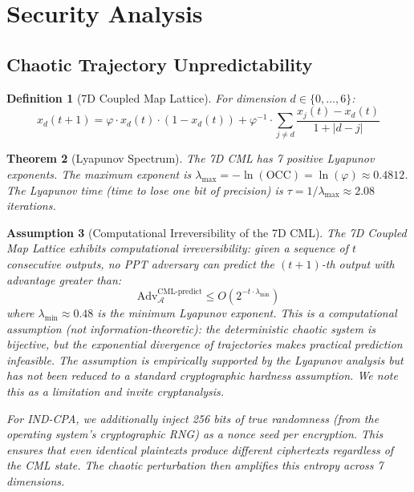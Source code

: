 \documentclass[11pt,a4paper]{article}
\newtheorem{theorem}{Theorem}[section]
\newtheorem{definition}[theorem]{Definition}
\newtheorem{assumption}[theorem]{Assumption}
\begin{document}
\section{Security Analysis}
\label{sec:security}

\subsection{Chaotic Trajectory Unpredictability}

\begin{definition}[7D Coupled Map Lattice]
For dimension $d \in \{0,\ldots,6\}$:
\begin{equation}
    x_d(t+1) = \varphi \cdot x_d(t) \cdot (1 - x_d(t)) + \varphi^{-1} \cdot \sum_{j \neq d} \frac{x_j(t) - x_d(t)}{1 + |d - j|}
\end{equation}
\end{definition}

\begin{theorem}[Lyapunov Spectrum]
The 7D CML has 7 positive Lyapunov exponents. The maximum exponent is $\lambda_{\max} = -\ln(\text{OCC}) = \ln(\varphi) \approx 0.4812$. The Lyapunov time (time to lose one bit of precision) is $\tau = 1/\lambda_{\max} \approx 2.08$ iterations.
\end{theorem}

\begin{assumption}[Computational Irreversibility of the 7D CML]
The 7D Coupled Map Lattice exhibits \textit{computational irreversibility}: given a sequence of $t$ consecutive outputs, no PPT adversary can predict the $(t+1)$-th output with advantage greater than:
\begin{equation}
    \text{Adv}^{\text{CML-predict}}_{\mathcal{A}} \leq O(2^{-t \cdot \lambda_{\min}})
\end{equation}
where $\lambda_{\min} \approx 0.48$ is the minimum Lyapunov exponent. This is a \textit{computational} assumption (not information-theoretic): the deterministic chaotic system is bijective, but the exponential divergence of trajectories makes practical prediction infeasible. The assumption is empirically supported by the Lyapunov analysis but has not been reduced to a standard cryptographic hardness assumption. We note this as a limitation and invite cryptanalysis.

For IND-CPA, we additionally inject 256 bits of true randomness (from the operating system's cryptographic RNG) as a nonce seed per encryption. This ensures that even identical plaintexts produce different ciphertexts regardless of the CML state. The chaotic perturbation then amplifies this entropy across 7 dimensions.
\end{assumption}
\end{document}
